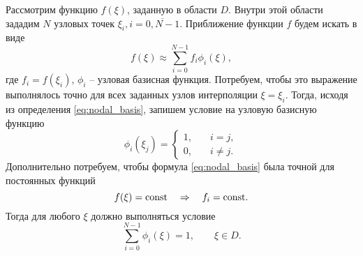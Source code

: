 
Рассмотрим функцию $f(\xi)$, заданную в области $D$.
Внутри этой области зададим $N$ узловых
точек $\xi_i, i=\overline{0,N-1}$.
Приближение функции $f$ будем искать в виде
\begin{equation}
\label{eq:nodal_basis}
f(\xi) \approx \sum_{i=0}^{N-1} f_i \phi_i(\xi),
\end{equation}
где  $f_i = f(\xi_i)$, $\phi_i$ -- узловая базисная функция.
Потребуем, чтобы это выражение выполнялось точно для всех
заданных узлов интерполяции $\xi = \xi_i$. Тогда, исходя из определения \cref{eq:nodal_basis}, запишем условие 
на узловую базисную функцию
\begin{equation}
\label{eq:nodal_bases_conditions}
\phi_i(\xi_j) = 
\begin{cases}
1, &\quad i = j, \\
0, &\quad i \neq j.
\end{cases}
\end{equation}
Дополнительно потребуем, чтобы формула \cref{eq:nodal_basis} была
точной для постоянных функций
$$
f(\xi)={\rm const} \quad\Rightarrow\quad f_i = {\rm const}.
$$
Тогда для любого $\xi$ должно выполняться условие
\begin{equation}
\label{eq:nodal_bases_unitsum}
\sum_{i=0}^{N-1} \phi_i(\xi) = 1, \qquad \xi \in D.
\end{equation}


